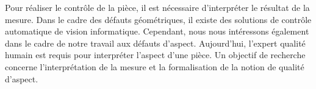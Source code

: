 
Pour réaliser le contrôle de la pièce, il est nécessaire d'interpréter le résultat de la mesure.
Dans le cadre des défauts géométriques, il existe des solutions de contrôle automatique de vision informatique.
Cependant, nous nous intéressons également dans le cadre de notre travail aux défauts d'aspect.
Aujourd'hui, l'expert qualité humain est requis pour interpréter l'aspect d'une pièce.
Un objectif de recherche concerne l'interprétation de la mesure et la formalisation de la notion de qualité d'aspect.

